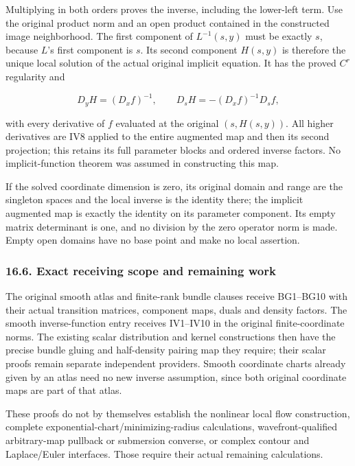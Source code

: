 \documentclass[
  11pt,
]{article}
\begin{document}
Multiplying in both orders proves the inverse, including the lower-left
term. Use the original product norm and an open product contained in the
constructed image neighborhood. The first component of \(L^{-1}(s,y)\)
must be exactly \(s\), because \(L\)'s first component is \(s\). Its
second component \(H(s,y)\) is therefore the unique local solution of
the actual original implicit equation. It has the proved \(C^r\)
regularity and

\[
 D_yH=(D_xf)^{-1},\qquad
 D_sH=-(D_xf)^{-1}D_sf,
 \tag{IV10}
\]

with every derivative of \(f\) evaluated at the original \((s,H(s,y))\).
All higher derivatives are IV8 applied to the entire augmented map and
then its second projection; this retains its full parameter blocks and
ordered inverse factors. No implicit-function theorem was assumed in
constructing this map.

If the solved coordinate dimension is zero, its original domain and
range are the singleton spaces and the local inverse is the identity
there; the implicit augmented map is exactly the identity on its
parameter component. Its empty matrix determinant is one, and no
division by the zero operator norm is made. Empty open domains have no
base point and make no local assertion.

\subsubsection{16.6. Exact receiving scope and remaining
work}\label{exact-receiving-scope-and-remaining-work}

The original smooth atlas and finite-rank bundle clauses receive
BG1--BG10 with their actual transition matrices, component maps, duals
and density factors. The smooth inverse-function entry receives
IV1--IV10 in the original finite-coordinate norms. The existing scalar
distribution and kernel constructions then have the precise bundle
gluing and half-density pairing map they require; their scalar proofs
remain separate independent providers. Smooth coordinate charts already
given by an atlas need no new inverse assumption, since both original
coordinate maps are part of that atlas.

These proofs do not by themselves establish the nonlinear local flow
construction, complete exponential-chart/minimizing-radius calculations,
wavefront-qualified arbitrary-map pullback or submersion converse, or
complex contour and Laplace/Euler interfaces. Those require their actual
remaining calculations.
\end{document}
